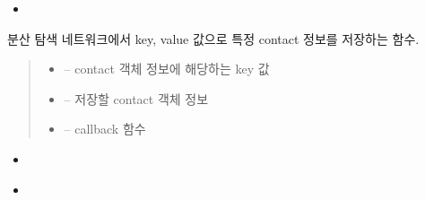 \documentclass[a4paper,10pt,english]{sphinxmanual}
\begin{document}
\begin{fulllineitems}
\begin{fulllineitems}
\begin{itemize}
\item {} 
\sphinxAtStartPar
{\hyperref[\detokenize{_kademlia:KNode.set}]{}}

\end{itemize}



\end{fulllineitems}


\begin{fulllineitems}
\label{\detokenize{_kademlia:KNode.set}}
\pysigstartsignatures
{}
\pysigstopsignatures
\sphinxAtStartPar
분산 탐색 네트워크에서 key, value 값으로 특정 contact 정보를 저장하는 함수.
\begin{quote}\begin{description}
\begin{itemize}
\item {} 
\sphinxAtStartPar
{} – contact 객체 정보에 해당하는 key 값

\item {} 
\sphinxAtStartPar
{} – 저장할 contact 객체 정보

\item {} 
\sphinxAtStartPar
{} – callback 함수

\end{itemize}

\end{description}\end{quote}


\nopagebreak

\begin{itemize}
\item {} 
\sphinxAtStartPar
{\hyperref[\detokenize{_kademlia:KNode._iterativeFindNode}]{}}

\item {} 
\sphinxAtStartPar
{\hyperref[\detokenize{_kademlia:KNode.get}]{}}


\end{itemize}
\end{fulllineitems}
\end{fulllineitems}
\end{document}
